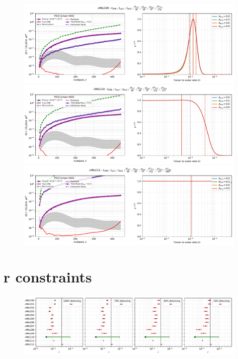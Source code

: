 \documentclass[11pt]{article}
\begin{document}
\begin{figure}
\centering
\includegraphics[width=1.2\textwidth]{ps_and_bbposterir_cMILC09.pdf}
\includegraphics[width=1.2\textwidth]{ps_and_bbposterir_cMILC10.pdf}
\includegraphics[width=1.2\textwidth]{ps_and_bbposterir_cMILC11.pdf}
\end{figure}

\newpage
\section{r constraints}
\begin{figure}
\centering
\includegraphics[width=1.2\textwidth]{PICO_summary_statistics.pdf}
\end{figure}
\end{document}
